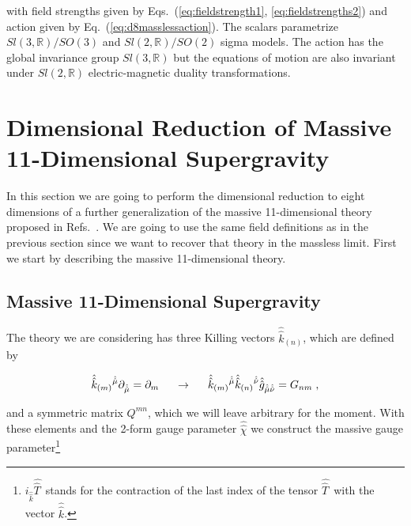 \documentclass[12pt,a4paper]{article}
\begin{document}
\noindent with field strengths given by Eqs.~(\ref{eq:fieldstrength1},
\ref{eq:fieldstrengths2}) and action given by
Eq.~(\ref{eq:d8masslessaction}). The scalars parametrize
$Sl(3,\mathbb{R})/SO(3)$ and $Sl(2,\mathbb{R})/SO(2)$ sigma models.
The action has the global invariance group $Sl(3,\mathbb{R})$ but the
equations of motion are also invariant under $Sl(2,\mathbb{R})$
electric-magnetic duality transformations.


\section{Dimensional Reduction of Massive 11-Dimensional Supergravity}
\label{sec-massivesugra}

In this section we are going to perform the dimensional reduction to
eight dimensions of a further generalization of the massive
11-dimensional theory proposed in Refs.~\cite{kn:BLO,kn:MO}. We are
going to use the same field definitions as in the previous section
since we want to recover that theory in the massless limit. First we
start by describing the massive 11-dimensional theory.

\subsection{Massive 11-Dimensional Supergravity}


The theory we are considering has three Killing vectors
$\hat{\hat{k}}_{(n)}$, which are defined by

\begin{equation}
\hat{\hat{k}}_{(m)}{}^{\hat{\hat{\mu}}}
\partial_{\hat{\hat{\mu}}}= \partial_{m} 
\hspace{.5cm}\rightarrow\hspace{.5cm}
\hat{\hat{k}}_{(m)}{}^{\hat{\hat{\mu}}}
\hat{\hat{k}}_{(n)}{}^{\hat{\hat{\nu}}}
\hat{\hat{g}}_{\hat{\hat{\mu}}\hat{\hat{\nu}}}=
G_{nm}\; ,
\label{eq:KillDef}
\end{equation}

\noindent and a symmetric matrix $Q^{mn}$, which we will leave 
arbitrary for the moment. With these elements and the 2-form gauge
parameter $\hat{\hat{\chi}}$ we construct the massive gauge
parameter\footnote{$i_{\hat{\hat{k}}}\hat{\hat{T}\,}$ stands for the
  contraction of the last index of the tensor $\hat{\hat{T}\,}$ with
  the vector $\hat{\hat{k}}$.}
\end{document}
